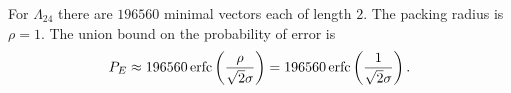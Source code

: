 \documentclass[draftcls, onecolumn, 11pt]{IEEEtran}
\begin{document}
For $\Lambda_{24}$ there are $196560$ minimal vectors each of length $2$.  The packing radius is $\rho = 1$.  The union bound on the probability of error is
\[
P_E \approx 196560\operatorname{erfc}\left( \frac{\rho}{\sqrt{2}\sigma} \right) = 196560\operatorname{erfc}\left(\frac{1}{\sqrt{2}\sigma}\right).
\]



\end{document}
